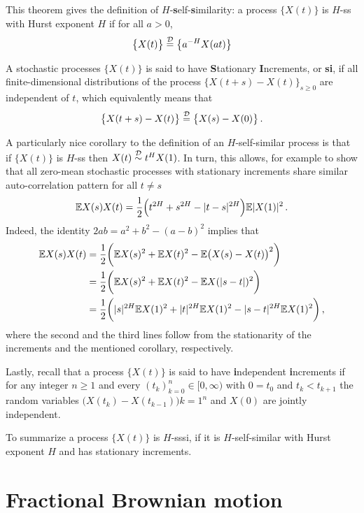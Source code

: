 This theorem gives the definition of $H$-\textbf{s}elf-\textbf{s}imilarity: \label{def:hsssi}
a process $\bigl\{X(t)\bigr\}$ is $H$-ss with Hurst exponent $H$ if for all $a>0$,
\[ \bigl\{X(t)\bigr\} \overset{\mathcal{D}}{=} \bigl\{a^{-H} X(at)\bigr\} \]

A stochastic processes $\bigl\{X(t)\bigr\}$ is said to have \textbf{S}tationary
\textbf{I}ncrements, or \textbf{si}, if all finite-dimensional distributions of
the process $\bigl\{X(t+s) - X(t)\bigr\}_{s\geq0}$ are independent of $t$, which
equivalently means that
\[ \bigl\{X(t+s)-X(t)\bigr\} \overset{\mathcal{D}}{=} \bigl\{X(s)-X(0)\bigr\} \,. \]

A particularly nice corollary to the definition of an $H$-self-similar process is that
if $\bigl\{X(t)\bigr\}$ is $H$-ss then $X(t)\overset{\mathcal{D}}{\sim}t^H X(1)$. In turn,
this allows, for example to show that all zero-mean stochastic processes with stationary
increments share similar auto-correlation pattern for all $t\neq s$
\[ \mathbb{E} X(s) X(t) = \frac{1}{2}\Bigl( t^{2H} + s^{2H} - |t-s|^{2H}\Bigr) \mathbb{E}|X(1)|^2 \,. \]
Indeed, the identity $2 a b = a^2 + b^2 - (a-b)^2$ implies that\begin{align*}
	\mathbb{E} X(s) X(t)
	&= \frac{1}{2}\biggl( \mathbb{E} X(s)^2 + \mathbb{E} X(t)^2 - \mathbb{E}\bigl( X(s) - X(t) \bigr)^2 \biggr) \\
	&= \frac{1}{2}\biggl( \mathbb{E} X(s)^2 + \mathbb{E} X(t)^2 - \mathbb{E} X(|s-t|)^2 \biggr) \\
	&= \frac{1}{2}\biggl( |s|^{2H} \mathbb{E} X(1)^2 + |t|^{2H} \mathbb{E} X(1)^2 - |s-t|^{2H} \mathbb{E} X(1)^2 \biggr) \,,
\end{align*}
where the second and the third lines follow from the stationarity of the increments
and the mentioned corollary, respectively.

Lastly, recall that a process $\bigl\{X(t)\bigr\}$ is said to have \textbf{i}ndependent
\textbf{i}ncrements if for any integer $n\geq1$ and every $(t_k)_{k=0}^n\in[0,\infty)$
with $0=t_0$ and $t_k < t_{k+1}$ the random variables $\bigl(X(t_k) - X(t_{k-1})\bigr){k=1}^n$
and $X(0)$ are jointly independent.

To summarize a process $\bigl\{X(t)\bigr\}$ is $H$-sssi, if it is $H$-self-similar
with Hurst exponent $H$ and has stationary increments.


\section{Fractional Brownian motion} %
\label{sec:fractional_brownian_motion}

